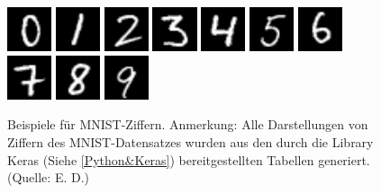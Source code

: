\documentclass[a4paper,12pt,ngerman,oneside]{scrreprt}	%
\begin{document}
		\begin{figure}[h]\label{MNISTbeispiele}
			\vspace{0.0cm} \centering
			\includegraphics[height=1.3cm]{mnistBeispiele/4080.png}
			\includegraphics[height=1.3cm]{mnistBeispiele/6329.png}
			\includegraphics[height=1.3cm]{mnistBeispiele/922.png}
			\includegraphics[height=1.3cm]{mnistBeispiele/270.png}
			\includegraphics[height=1.3cm]{mnistBeispiele/56.png}
			\includegraphics[height=1.3cm]{mnistBeispiele/253.png}
			\includegraphics[height=1.3cm]{mnistBeispiele/21.png}
			\includegraphics[height=1.3cm]{mnistBeispiele/4225.png}
			\includegraphics[height=1.3cm]{mnistBeispiele/6275.png}
			\includegraphics[height=1.3cm]{mnistBeispiele/560.png}
			\caption{Beispiele für MNIST-Ziffern. Anmerkung: Alle Darstellungen von Ziffern des MNIST-Datensatzes wurden aus den durch die Library Keras (Siehe \ref{Python&Keras}) bereitgestellten Tabellen generiert. (Quelle: E. D.)}
		\end{figure}
\end{document}

